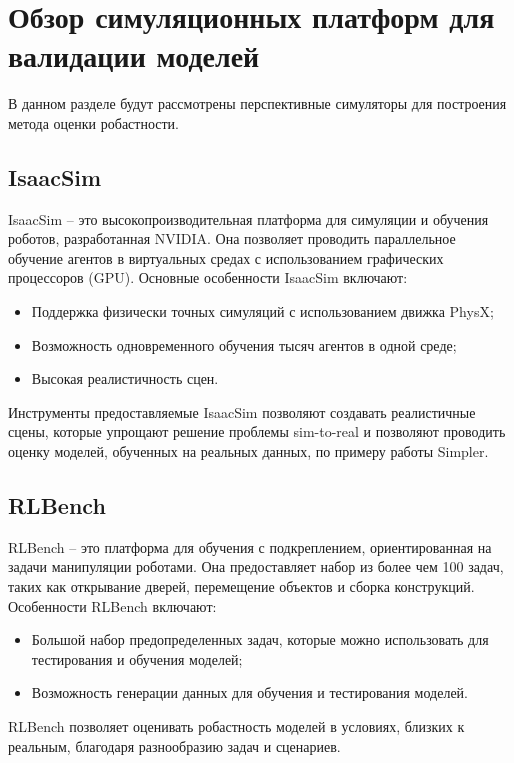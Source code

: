     \section{Обзор симуляционных платформ для валидации моделей}

    В данном разделе будут рассмотрены перспективные симуляторы для построения метода оценки робастности.

    \subsection{IsaacSim}
    IsaacSim \cite{nvidia_isaac_sim} -- это высокопроизводительная платформа для симуляции и обучения роботов, разработанная NVIDIA. Она позволяет проводить параллельное обучение агентов в виртуальных средах с использованием графических процессоров (GPU). Основные особенности IsaacSim включают:
    \begin{itemize}
        \item Поддержка физически точных симуляций с использованием движка PhysX;
        \item Возможность одновременного обучения тысяч агентов в одной среде;
        \item Высокая реалистичность сцен.
    \end{itemize}
    
    Инструменты предоставляемые IsaacSim позволяют создавать реалистичные сцены, которые упрощают решение проблемы sim-to-real и позволяют проводить оценку моделей, обученных на реальных данных, по примеру работы Simpler.
    
    \subsection{RLBench}
    RLBench \cite{james2020rlbench} -- это платформа для обучения с подкреплением, ориентированная на задачи манипуляции роботами. Она предоставляет набор из более чем 100 задач, таких как открывание дверей, перемещение объектов и сборка конструкций. Особенности RLBench включают:
    \begin{itemize}
        \item Большой набор предопределенных задач, которые можно использовать для тестирования и обучения моделей;
        \item Возможность генерации данных для обучения и тестирования моделей.
    \end{itemize}
    RLBench позволяет оценивать робастность моделей в условиях, близких к реальным, благодаря разнообразию задач и сценариев.
    
